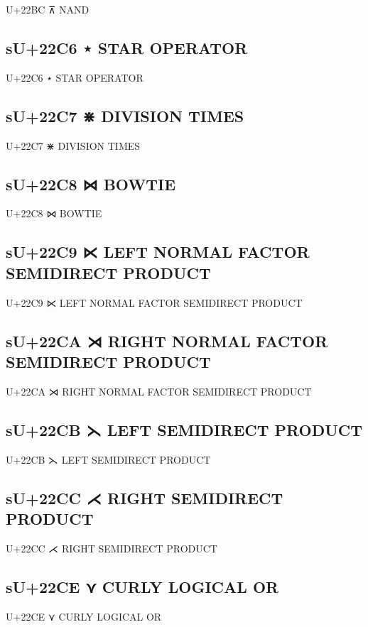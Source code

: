U+22BC ⊼ NAND

\subsection{sU+22C6 ⋆ STAR OPERATOR}

U+22C6 ⋆ STAR OPERATOR

\subsection{sU+22C7 ⋇ DIVISION TIMES}

U+22C7 ⋇ DIVISION TIMES

\subsection{sU+22C8 ⋈ BOWTIE}

U+22C8 ⋈ BOWTIE

\subsection{sU+22C9 ⋉ LEFT NORMAL FACTOR SEMIDIRECT PRODUCT}

U+22C9 ⋉ LEFT NORMAL FACTOR SEMIDIRECT PRODUCT

\subsection{sU+22CA ⋊ RIGHT NORMAL FACTOR SEMIDIRECT PRODUCT}

U+22CA ⋊ RIGHT NORMAL FACTOR SEMIDIRECT PRODUCT

\subsection{sU+22CB ⋋ LEFT SEMIDIRECT PRODUCT}

U+22CB ⋋ LEFT SEMIDIRECT PRODUCT

\subsection{sU+22CC ⋌ RIGHT SEMIDIRECT PRODUCT}

U+22CC ⋌ RIGHT SEMIDIRECT PRODUCT

\subsection{sU+22CE ⋎ CURLY LOGICAL OR}

U+22CE ⋎ CURLY LOGICAL OR

